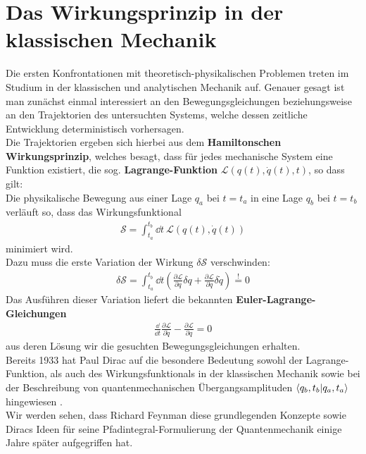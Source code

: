 \section{Das Wirkungsprinzip in der klassischen Mechanik}
Die ersten Konfrontationen mit theoretisch-physikalischen Problemen treten im Studium in der klassischen und analytischen Mechanik auf. Genauer gesagt ist man zunächst einmal interessiert an den Bewegungsgleichungen beziehungsweise an den Trajektorien des untersuchten Systems, welche dessen zeitliche Entwicklung deterministisch vorhersagen. \\
Die Trajektorien ergeben sich hierbei aus dem \textbf{Hamiltonschen Wirkungsprinzip}, welches besagt, dass für jedes mechanische System eine Funktion existiert, die sog. \textbf{Lagrange-Funktion} $\mathcal{L}(q(t),\dot{q}(t),t)$, so dass gilt: \\

Die physikalische Bewegung aus einer Lage $q_a$ bei $t = t_a$ in eine Lage $q_b$ bei $t = t_b$ verläuft so, dass das Wirkungsfunktional
\begin{align}
	\mathcal{S} = \int_{t_a}^{t_b} \dd t \ \mathcal{L}(q(t),\dot{q}(t)) 
\end{align}
minimiert wird. \\
Dazu muss die erste Variation der Wirkung $\delta\mathcal{S}$ verschwinden:
\begin{align}
		\delta \mathcal{S} = \int_{t_a}^{t_b} \dd t \left(\frac{\partial \mathcal{L}}{\partial q} \delta q + \frac{\partial \mathcal{L}}{\partial \dot{q}} \delta \dot{q}\right) \overset{!}{ = } 0
	\end{align}
Das Ausführen dieser Variation liefert die bekannten \textbf{Euler-Lagrange-Gleichungen} 
\begin{align}
		\frac{\dd}{\dd t}\frac{\partial \mathcal{L}}{\partial \dot{q}} - \frac{\partial \mathcal{L}}{\partial q} = 0
\end{align}
aus deren Lösung wir die gesuchten Bewegungsgleichungen erhalten. \\
Bereits 1933 hat Paul Dirac auf die besondere Bedeutung sowohl der Lagrange-Funktion, als auch des Wirkungsfunktionals in der klassischen Mechanik sowie bei der Beschreibung von quantenmechanischen Übergangsamplituden $\braket{q_b,t_b}{q_a,t_a}$ hingewiesen \cite{Dirac1934}. \\
Wir werden sehen, dass Richard Feynman diese grundlegenden Konzepte sowie Diracs Ideen für seine Pfadintegral-Formulierung der Quantenmechanik einige Jahre später aufgegriffen hat.

